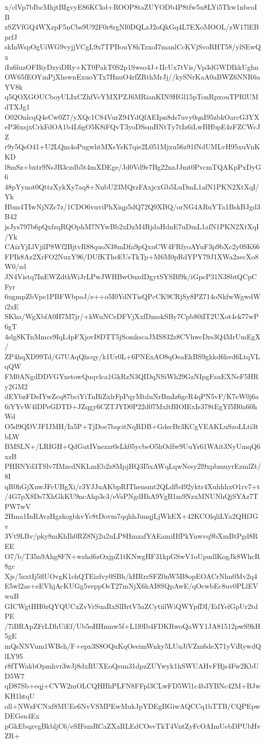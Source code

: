 x/clVp7bIbcMhjtBIgvyE86KCkd+ROOP8taZUYODb4P8tfw5u8LYi5Tkw1nbcoIB
zSZVfGQ4WXzpF5nCbs9U92F0r8rgNl0DQLzJ2oQkGq4L7EXoMOOL/zW17lEBprfJ
skInWspOgUiWG9vyjjVCgL9x7TPBouY8hTzxoI7manlCcKVjSvoRHT58/ylSEwQx
iIu6luzOFBiyDzyiDRy+KT0PakT0S2p1Swso4J+IIcUx7tVis/Vp3dGWDIkkUghn
OW65fEOYmPjXhswnExuoYTx7HnuO4rfZRthMrJj//kySNrKaA0aBWZ6NNR6aYV8k
q5QOXGOUCboyULIxCZhfVcYMXPZJ6MRianKIN9HGl15pTonRpxouTPRlUMdTXJg1
O02OnlcqQ4eCw0Z7/yXQc1C84VurZ94YdQfAEIpn8ds7uvy0qnI95zbkOarcG3YX
eP36xsjxCrkFdOA1b4L6gO5K8iFQvT3yoDSsmBNtTy7tIz6iLwBHbpE4zFZCWcJZ
r9y5QsO41+U2LQm4oPugwhtMXsYsK7qie2L051Mjxu56z91fNdUMLvH95xuVnKKD
l8mSz+bxtr9NsJB3czdb5t4mXDEge/Jd0Vd9e7Bg22nzJJmt0PvcmTQAKpPxDyG6
48pYynot0QttzXykXy7aq8+NnbU23MQrzFAxjcxGb5LuDmL1afN1PKN2XtXqI/Yk
Hbm4TIwNjNZc7z/1CDO6vuviPhXiqp5dQ72Q9XBQ/orNG4ARuYTa1BskBJgd3B42
jsJys797b6pQxfzqRQOphM7NYwBb2xDzM4RjdaHdnE7uDmL1afN1PKN2XtXqI/Yk
CAizYjLlVjilP8Wf2BjtvR88quoN38mDfa9pQxuCW4FRfyoAYuF3p9bXc2y0SK66
FPIk8Az2XrFO2NuxY96/DUfKTheEUsTkTp+M6M0pRdYPY79J1XWa2zecXo8W0/zd
JN4Vistq7InEWZdtkWiJrLPwJWHBwOuzdDgytSYSBf9k/iGpcP31N38btQCpCFyr
6ugmpZbVpe1PBFWbpoJ/e++o5I0YdNTisQPcCK9CRjSy8PZ714oNkfwWgwdWi2xE
SKha/WgXbfA0H7M7jr/+kWuNCeDFVjXxfDmokSBy7Cpb80iIT2UXot4ck77wP6gT
4slg8KTnMmcs9IqL4pFXjovI8DTT5jSomkscaJMS832z8CVhwcDrs3Q4MrUmEgX/
ZP4hqXD99Td/G7UAqQhcqy/k1Ur0L+6PNExAO8qOeaEkBS9gkkd6hvd6LtqVLqQW
FM0ANgdDDVGYxetowQuqvlca1GkRzN3QIDqNSiWh29GzNIpgFauEXNeF5HRy2GM2
dEYbzFDeIYwZcq87bciYiTnBiZxlrFpPqyMtduNrBmIz6gcR4qPN5vF/K7eW0j6a
6iYYvW4lDPeGDTD+JZqgy6CZTJYD0P22d07MxltBIOIExIs378tEgYf5B0a60hWd
O5d9QDVJFIJMH/Ia5P+TjDoe7bqcitNqRDB+GdscBr3KCgVEAKLuSzoLLti3tbLW
BMSLN+/LRIGH+QdGutIVnezzr0sLk05ycbeO5hOdfw9UuYr61WAit3NyUmqQ6xzB
PHBNYd3TSlv7IMzcdNKLmEb2z8MpjHQ3I5xAWqLqwNesy2l9xpbmuyrEzmlZt/8I
qR0hGjXuwJFcUBgXi/r3YJJuAKbpRIThensmt2QLdfb492yktr4XuhhhxO1rv7+t
/4G7pX8Ds7XhGkKU9ncAhp3c3/eVsPNgdHhA9VgB1m9NzxMNUNhQjSYAz7TPW7wV
2Hma1InRAvzHgzkogbkvYc8tDovm7qqhhJimqjLjWkEX+42KCOlqliLYa2QHfJGv
3Vt9LBv/pky8mKhIh0RZ8Nj2u2uLP8HmzafYAEamiIIfPkYnwvq9bXmBtPgd8REE
O7/b/T35n9Ahg8FN+wzhd6zOxjpZ1tKNwgHF31kpGSwV1oUpudlKogJk8WhcR8gc
Xjs/5zxtIj5flUOvgK1chQTEizfvy0SBh/kHRrrSFZ0nW5B8opEOACrNhn0Mv2q4
E5wl2as+eEVhjAcKUGg5veppOsT27mNjX6hAI8SQpAwE/qOcwbEc8uv0PLlEVwuB
GICWgtHH0zQYQUCxZvVrSuaRxSlBrtV5aZCytiilWiQWYpfDI/EdYelGpUr2tdPE
/7iBRApZFrLDhUiEf/Ub5oHHmnw5f+L1l0Ib4FDKRwoQaWY1JA81512pwS9kH5gE
mQsNNVum1WBch/F+epx3S8OQuKqOeeimWnky5LUuJiVZm6deX71yViRywdQlLY95
r8fTWakbOpmhvr3wJj8dxRUXEoQsun31dpzZUYwyk1hSWUAHvFHjs4Fw2KbUD5W7
qD87Sb+eqj+CVW2mOLCQHHhPLFN8FFpl3CLwFD5Wl1c4b3YBNc42M+BJwKH1htqU
oll+NWzFCNxf8MUEe6NvVSMPEwMukJpYDEgBGiwAQCCq1bTTB/CQPEpwDEGsn4Ex
pGkEbqzvgBkbljC6/eSIFsmRCaZXaRLEdCOsvTkT4VntZyFcOAImUebDPUbHvZR+
